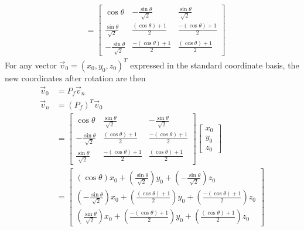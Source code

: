 \begin{solution}
\begin{align*}
&= 
\begin{bmatrix}
\cos{\theta} & -\frac{\sin{\theta}}{\sqrt{2}} & \frac{\sin{\theta}}{\sqrt{2}} \\
\frac{\sin{\theta}}{\sqrt{2}} & \frac{(\cos{\theta}) + 1}{2} & \frac{-(\cos{\theta}) + 1}{2} \\
-\frac{\sin{\theta}}{\sqrt{2}} & \frac{-(\cos{\theta}) + 1}{2} & \frac{(\cos{\theta}) + 1}{2}
\end{bmatrix}
\end{align*}
For any vector $\vec{v}_0 = (x_0,y_0,z_0)^T$ expressed in the standard coordinate basis, the new coordinates after rotation are then
\begin{align*}
\vec{v}_0 &= P_f \vec{v}_n \\
\vec{v}_n &= (P_f)^T\vec{v}_0 \\
&=
\begin{bmatrix}
\cos{\theta} & \frac{\sin{\theta}}{\sqrt{2}} & -\frac{\sin{\theta}}{\sqrt{2}} \\
-\frac{\sin{\theta}}{\sqrt{2}} & \frac{(\cos{\theta}) + 1}{2} & \frac{-(\cos{\theta}) + 1}{2} \\
\frac{\sin{\theta}}{\sqrt{2}} & \frac{-(\cos{\theta}) + 1}{2} & \frac{(\cos{\theta}) + 1}{2}
\end{bmatrix}
\begin{bmatrix}
x_0 \\
y_0 \\
z_0
\end{bmatrix} \\
&=
\begin{bmatrix}
(\cos{\theta})x_0 + (\frac{\sin{\theta}}{\sqrt{2}})y_0 + (-\frac{\sin{\theta}}{\sqrt{2}})z_0 \\
(-\frac{\sin{\theta}}{\sqrt{2}})x_0 + (\frac{(\cos{\theta}) + 1}{2})y_0 + (\frac{-(\cos{\theta}) + 1}{2})z_0 \\
(\frac{\sin{\theta}}{\sqrt{2}})x_0 + (\frac{-(\cos{\theta}) + 1}{2})y_0 + (\frac{(\cos{\theta}) + 1}{2})z_0
\end{bmatrix}
\end{align*}
\end{solution}
